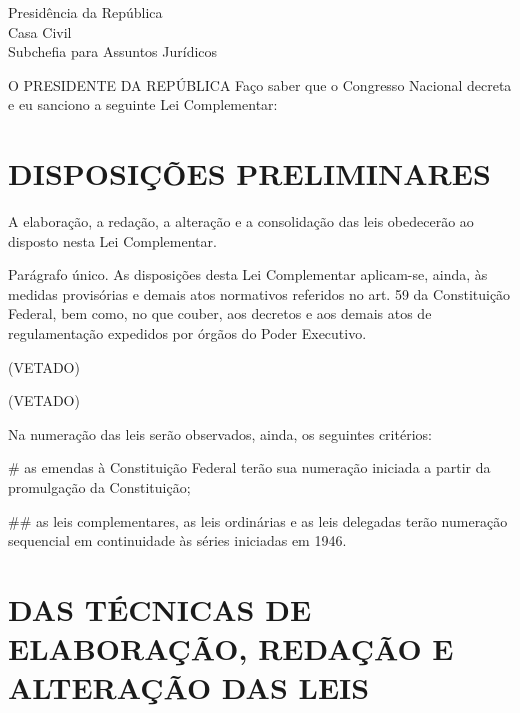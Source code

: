 \documentclass[a4paper,capitulo,titlepage=false]{br-lex}
\begin{document}
\begin{center}
		Presidência da República\\
	Casa Civil\\
	Subchefia para Assuntos Jurídicos	
\end{center}




O PRESIDENTE DA REPÚBLICA Faço  saber  que   o    Congresso  Nacional decreta e eu sanciono  a  seguinte Lei Complementar:
	
\chapter{DISPOSIÇÕES PRELIMINARES}
\label{chap:disposicoes}


\artigo A elaboração, a redação, a alteração e a consolidação das leis obedecerão ao disposto nesta Lei Complementar.

Parágrafo único. As disposições desta Lei Complementar aplicam-se, ainda, às medidas provisórias e demais atos normativos referidos no art. 59 da Constituição Federal, bem como, no que couber, aos decretos e aos demais atos de regulamentação expedidos por órgãos do Poder Executivo.

\artigo (VETADO)

\begin{paragrafos}
\paragrafo (VETADO)

\paragrafo Na numeração das leis serão observados, ainda, os seguintes critérios:
\end{paragrafos}


\begin{easylist}

#  as emendas à Constituição Federal terão sua numeração iniciada a partir da promulgação da Constituição;

##  as leis complementares, as leis ordinárias e as leis delegadas terão numeração sequencial em continuidade às séries iniciadas em 1946.

\end{easylist}

\chapter[Das técnicas de elaboração, redação e alteração das leis]{DAS TÉCNICAS DE ELABORAÇÃO, REDAÇÃO E ALTERAÇÃO DAS LEIS}
\label{chap:tecnicas}
\end{document}
